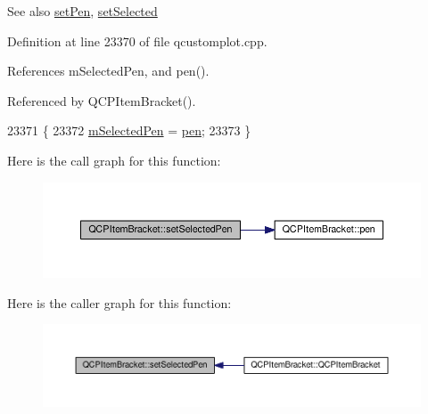 \begin{DoxySeeAlso}{See also}
\hyperlink{class_q_c_p_item_bracket_ab13001d9cc5d8f9e56ea15bdda682acb}{set\+Pen}, \hyperlink{class_q_c_p_abstract_item_a203de94ad586cc44d16c9565f49d3378}{set\+Selected} 
\end{DoxySeeAlso}


Definition at line 23370 of file qcustomplot.\+cpp.



References m\+Selected\+Pen, and pen().



Referenced by Q\+C\+P\+Item\+Bracket().


\begin{DoxyCode}
23371 \{
23372   \hyperlink{class_q_c_p_item_bracket_adcfb53602d1802d00e2de4fd6df6b291}{mSelectedPen} = \hyperlink{class_q_c_p_item_bracket_a8963ff4a232b649c83d2461fd3c30d39}{pen};
23373 \}
\end{DoxyCode}


Here is the call graph for this function\+:\nopagebreak
\begin{figure}[H]
\begin{center}
\leavevmode
\includegraphics[width=350pt]{class_q_c_p_item_bracket_a349785c31122778a520c64891fa204c5_cgraph}
\end{center}
\end{figure}




Here is the caller graph for this function\+:\nopagebreak
\begin{figure}[H]
\begin{center}
\leavevmode
\includegraphics[width=350pt]{class_q_c_p_item_bracket_a349785c31122778a520c64891fa204c5_icgraph}
\end{center}
\end{figure}


\hypertarget{class_q_c_p_item_bracket_a612dffa2373422eef8754d690add3703}{}

